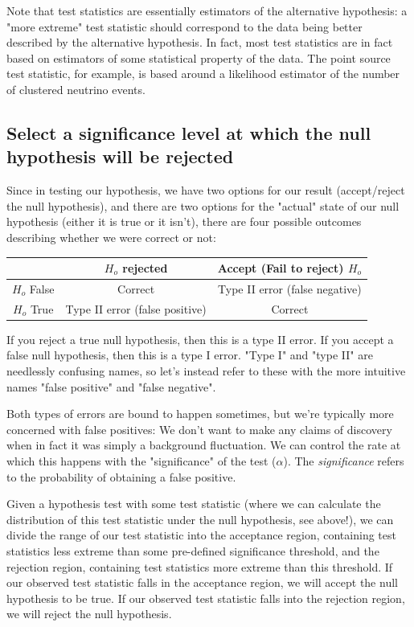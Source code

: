Note that test statistics are essentially estimators of the alternative hypothesis: a "more extreme" test statistic should correspond to the data being better described by the alternative hypothesis. In fact, most test statistics are in fact based on estimators of some statistical property of the data. The point source test statistic, for example, is based around a likelihood estimator of the number of clustered neutrino events. 

\subsection{Select a significance level at which the null hypothesis will be rejected}
Since in testing our hypothesis, we have two options for our result (accept/reject the null hypothesis), and there are two options for the "actual" state of our null hypothesis (either it is true or it isn't), there are four possible outcomes describing whether we were correct or not:

\begin{center}
 \begin{tabular}{|c || c | c|} 
 \hline
  & $H_o$ rejected     & Accept (Fail to reject) $H_o$ \\ [0.5ex] 
 \hline\hline
 $H_o$ False & Correct & Type II error (false negative) \\ 
 \hline
 $H_o$ True & Type II error (false positive) & Correct \\ [1ex] 
 \hline
\end{tabular}
\end{center}

If you reject a true null hypothesis, then this is a type II error. If you accept a false null hypothesis, then this is a type I error. "Type I" and "type II" are needlessly confusing names, so let's instead refer to these with the more intuitive names "false positive" and "false negative". 

Both types of errors are bound to happen sometimes, but we're typically more concerned with false positives: We don't want to make any claims of discovery when in fact it was simply a background fluctuation. We can control the rate at which this happens with the "significance" of the test ($\alpha$). The \textit{significance} refers to the probability of obtaining a false positive. 

Given a hypothesis test with some test statistic (where we can calculate the distribution of this test statistic under the null hypothesis, see above!), we can divide the range of our test statistic into the acceptance region, containing test statistics less extreme than some pre-defined significance threshold, and the rejection region, containing test statistics more extreme than this threshold. If our observed test statistic falls in the acceptance region, we will accept the null hypothesis to be true. If our observed test statistic falls into the rejection region, we will reject the null hypothesis. 

